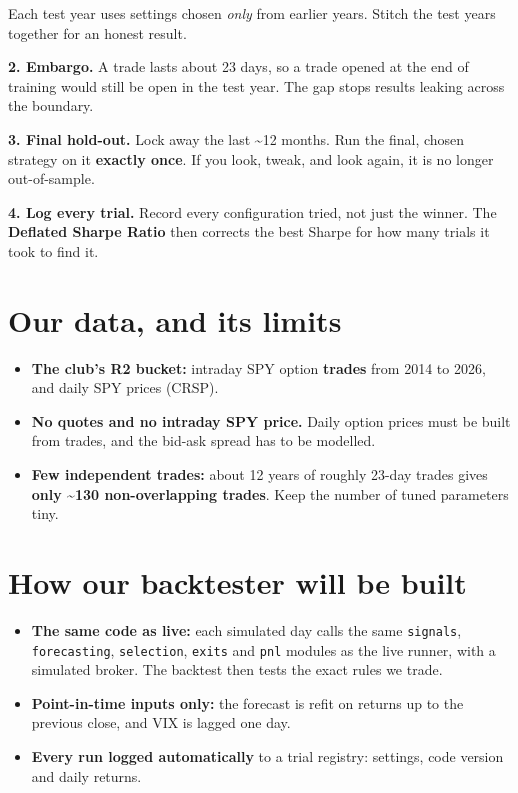 \documentclass{article}
\begin{document}
Each test year uses settings chosen \emph{only} from earlier years. Stitch the test years together for an honest result.

\textbf{2. Embargo.} A trade lasts about 23 days, so a trade opened at the end of training would still be open in the test year. The gap stops results leaking across the boundary.

\textbf{3. Final hold-out.} Lock away the last \textasciitilde{}12 months. Run the final, chosen strategy on it \textbf{exactly once}. If you look, tweak, and look again, it is no longer out-of-sample.

\textbf{4. Log every trial.} Record every configuration tried, not just the winner. The \textbf{Deflated Sharpe Ratio} then corrects the best Sharpe for how many trials it took to find it.

\section{Our data, and its limits}

\begin{itemize}

\item \textbf{The club's R2 bucket:} intraday SPY option \textbf{trades} from 2014 to 2026, and daily SPY prices (CRSP).

\item \textbf{No quotes and no intraday SPY price.} Daily option prices must be built from trades, and the bid-ask spread has to be modelled.

\item \textbf{Few independent trades:} about 12 years of roughly 23-day trades gives \textbf{only \textasciitilde{}130 non-overlapping trades}. Keep the number of tuned parameters tiny.

\end{itemize}

\section{How our backtester will be built}

\begin{itemize}

\item \textbf{The same code as live:} each simulated day calls the same \texttt{signals}, \texttt{forecasting}, \texttt{selection}, \texttt{exits} and \texttt{pnl} modules as the live runner, with a simulated broker. The backtest then tests the exact rules we trade.

\item \textbf{Point-in-time inputs only:} the forecast is refit on returns up to the previous close, and VIX is lagged one day.

\item \textbf{Every run logged automatically} to a trial registry: settings, code version and daily returns.

\end{itemize}
\end{document}
